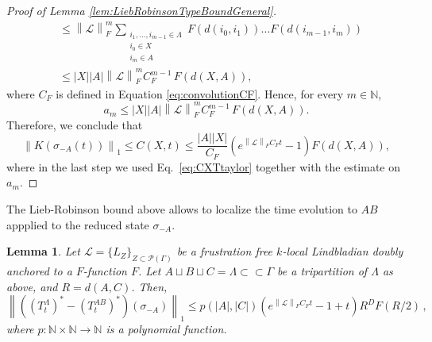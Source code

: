\documentclass[11pt]{article}
\numberwithin{equation}{section}
\numberwithin{figure}{section}
\numberwithin{table}{section}
\theoremstyle{definition}
\theoremstyle{plain}
\newtheorem{lem}[thm]{Lemma}
\theoremstyle{remark}
\newcommand{\Li}{\mathcal{L}}
\newcommand{\La}{\Lambda}
\newcommand{\G}{\Gamma}
\newcommand{\normm}[2]{\left\lVert#1\right\rVert_{#2}}
\newcommand{\summ}[1]{\sum\limits_{\substack{ #1 }}}
\newcommand{\abs}[1]{\left \vert#1\right\vert}
\begin{document}
\begin{proof}[Proof of Lemma \ref{lem:LiebRobinsonTypeBoundGeneral}]
\begin{align}
    &\nonumber\leq\normm{\Li}{F}^m \summ{i_1,\dots,i_{m-1}\in \La\\i_0\in X\\i_m\in A}F(d(i_{0},i_1))\dots F(d(i_{m-1},i_m))\\
    &\nonumber\leq  \abs{X}\abs{A} \normm{\Li}{F}^m C_F^{m-1} \, F (d(X,A)) ,
\end{align}
where $C_F$ is defined in Equation \eqref{eq:convolutionCF}. Hence, for every $m\in\mathbb{N}$,
\begin{equation}
     a_m\leq \abs{X}\abs{A} \normm{\Li}{F}^m C_F^{m-1} \, F (d(X,A)).
\end{equation}
Therefore, we conclude that 
\begin{equation}
    \normm{K(\sigma_{-A}(t))}{1}\leq C(X,t)\leq \dfrac{\abs{A}\abs{X}}{C_F} (e^{\normm{\Li}{F}C_Ft}-1) F(d(X,A)) ,
\end{equation}
where in the last step we used Eq.~\eqref{eq:CXTtaylor} together with the estimate on $a_m$.
\end{proof}  

The Lieb-Robinson bound above allows to localize the time evolution to $AB$ appplied to the reduced state $\sigma_{-A}$.

    \medskip
    \begin{lem}\label{lem:differenceTimeEvolutionsGeneral}
       Let $\Li=\{L_Z\}_{Z\subset \mathcal{P}(\G)}$ be a  frustration free $k$-local Lindbladian doubly anchored to a $F$-function $F$. Let $A\sqcup B\sqcup C=\La\subset \subset\G$ be a tripartition of $\La$ as above, and $R=d(A,C)$. Then,
       \begin{equation}
            \normm{\left (\left (T^\Lambda_t\right )^*-\left (T^{AB}_t\right )^*\right )(\sigma_{-A})}{1}\leq p(\abs{A},\abs{C}) (e^{\normm{\Li}{F}C_Ft}-1+t)R^DF(R/2)  \, ,     
        \end{equation}
       where $p:\mathbb{N}\times\mathbb{N}\to \mathbb{N}$ is a polynomial function.
    \end{lem}
   
\end{document}
